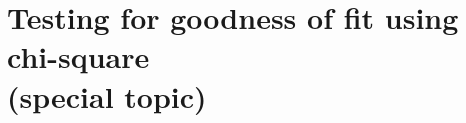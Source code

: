 %
%
%
%
%





\section[Testing for goodness of fit using chi-square (special topic)]{Testing for goodness of fit using chi-square \\(special topic) ~}
\label{oneWayChiSquare}

